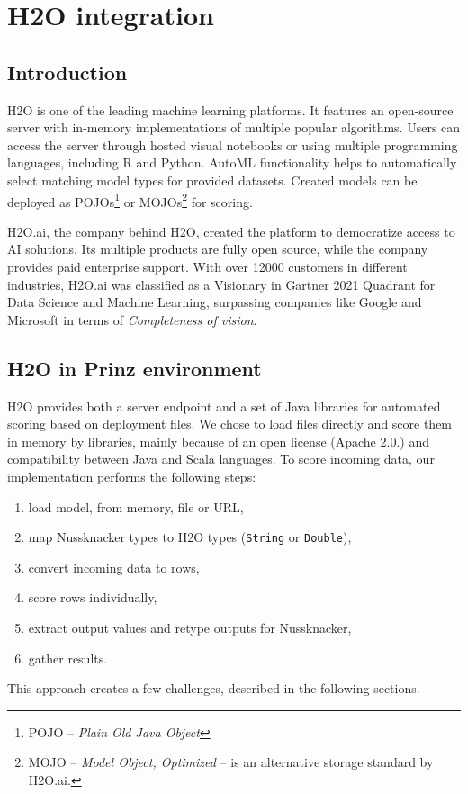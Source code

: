 \chapter{H2O integration}
\label{chap:h2o}

\section{Introduction}

H2O is one of the leading machine learning platforms.
It features an open-source server with in-memory implementations of multiple popular algorithms.
Users can access the server through hosted visual notebooks or using multiple programming languages, including R and Python.
AutoML functionality helps to automatically select matching model types for provided datasets.
Created models can be deployed as
POJOs\footnote{POJO -- \emph{Plain Old Java Object}}
or MOJOs\footnote{MOJO -- \emph{Model Object, Optimized} -- is an alternative storage standard by H2O.ai.}
for scoring.

H2O.ai, the company behind H2O, created the platform to democratize access to AI solutions.
Its multiple products are fully open source, while the company provides paid enterprise support.
With over 12000 customers in different industries, H2O.ai was classified as a Visionary in Gartner 2021 Quadrant for Data Science and Machine Learning, surpassing companies like Google and Microsoft in terms of \emph{Completeness of vision}.

\section{H2O in Prinz environment}

H2O provides both a server endpoint and a set of Java libraries for automated scoring based on deployment files.
We chose to load files directly and score them in memory by libraries, mainly because of an open license (Apache 2.0.) and compatibility between Java and Scala languages.
To score incoming data, our implementation performs the following steps:
\begin{enumerate}
  \item load model, from memory, file or URL,
  \item map Nussknacker types to H2O types (\texttt{String} or \texttt{Double}),
  \item convert incoming data to rows,
  \item score rows individually,
  \item extract output values and retype outputs for Nussknacker,
  \item gather results.
\end{enumerate}
This approach creates a few challenges, described in the following sections.

